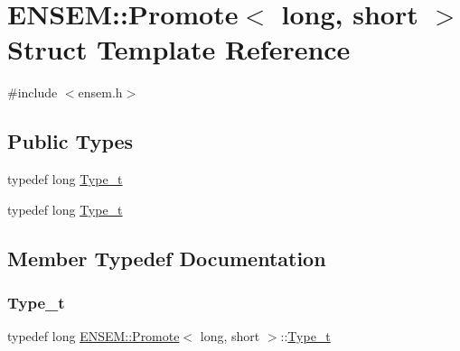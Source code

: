 \hypertarget{structENSEM_1_1Promote_3_01long_00_01short_01_4}{}\section{E\+N\+S\+EM\+:\+:Promote$<$ long, short $>$ Struct Template Reference}
\label{structENSEM_1_1Promote_3_01long_00_01short_01_4}


{\ttfamily \#include $<$ensem.\+h$>$}

\subsection*{Public Types}
\begin{DoxyCompactItemize}
\item 
typedef long \mbox{\hyperlink{structENSEM_1_1Promote_3_01long_00_01short_01_4_ad4dfbe27e4b99b58da27d3d26440cb0c}{Type\+\_\+t}}
\item 
typedef long \mbox{\hyperlink{structENSEM_1_1Promote_3_01long_00_01short_01_4_ad4dfbe27e4b99b58da27d3d26440cb0c}{Type\+\_\+t}}
\end{DoxyCompactItemize}


\subsection{Member Typedef Documentation}
\mbox{\label{structENSEM_1_1Promote_3_01long_00_01short_01_4_ad4dfbe27e4b99b58da27d3d26440cb0c}} 
\subsubsection{\texorpdfstring{Type\_t}{Type\_t}\hspace{0.1cm}{\footnotesize\ttfamily [1/2]}}
{\footnotesize\ttfamily typedef long \mbox{\hyperlink{structENSEM_1_1Promote}{E\+N\+S\+E\+M\+::\+Promote}}$<$ long, short $>$\+::\mbox{\hyperlink{structENSEM_1_1Promote_3_01long_00_01short_01_4_ad4dfbe27e4b99b58da27d3d26440cb0c}{Type\+\_\+t}}}

\mbox{\label{structENSEM_1_1Promote_3_01long_00_01short_01_4_ad4dfbe27e4b99b58da27d3d26440cb0c}} 
